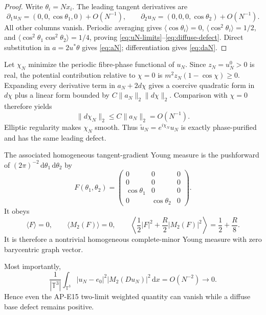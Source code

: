 \documentclass[10pt]{article}
\newcommand{\dd}{\,\mathrm d}
\newcommand{\TT}{\mathbb T}
\begin{document}
\begin{proof}
Write $\theta_i=Nx_i$.  The leading tangent derivatives are
\[
 \partial_1u_N=(0,0,\cos\theta_1,0)+O(N^{-1}),\qquad
 \partial_2u_N=(0,0,0,\cos\theta_2)+O(N^{-1}).
\]
All other columns vanish.  Periodic averaging gives
$\langle\cos\theta_i\rangle=0$,
$\langle\cos^2\theta_i\rangle=1/2$, and
$\langle\cos^2\theta_1\cos^2\theta_2\rangle=1/4$, proving
\eqref{eq:uN-limits}--\eqref{eq:diffuse-defect}.  Direct substitution in
$a=2u^*\theta$ gives \eqref{eq:aN}; differentiation gives \eqref{eq:daN}.
\end{proof}

Let $\chi_N$ minimize the periodic fibre-phase functional of $u_N$.  Since
$z_N=u_N^0>0$ is real, the potential contribution relative to $\chi=0$ is
$m^2z_N(1-\cos\chi)\geq0$.  Expanding every derivative term in
$a_N+2d\chi$ gives a coercive quadratic form in $d\chi$ plus a linear form
bounded by $C\|a_N\|_2\|d\chi\|_2$.  Comparison with $\chi=0$ therefore yields
\begin{equation}
 \|d\chi_N\|_2\leq C\|a_N\|_2=O(N^{-1}).
 \label{eq:phase-correction}
\end{equation}
Elliptic regularity makes $\chi_N$ smooth.  Thus
$\widetilde u_N=e^{i\chi_N}u_N$ is exactly phase-purified and has the same
leading defect.

The associated homogeneous tangent-gradient Young measure is the pushforward
of $(2\pi)^{-2}\dd\theta_1\dd\theta_2$ by
\begin{equation}
 F(\theta_1,\theta_2)=
 \begin{pmatrix}
 0&0&0\\
 0&0&0\\
 \cos\theta_1&0&0\\
 0&\cos\theta_2&0
 \end{pmatrix}.
 \label{eq:young-generator}
\end{equation}
It obeys
\begin{equation}
 \langle F\rangle=0,\qquad
 \langle M_2(F)\rangle=0,\qquad
 \left\langle\frac12|F|^2+\frac R2|M_2(F)|^2\right\rangle
 =\frac12+\frac R8.
 \label{eq:young-gap}
\end{equation}
It is therefore a nontrivial homogeneous complete-minor Young measure with
zero barycentric graph vector.

Most importantly,
\begin{equation}
 \frac1{|\TT^3|}\int_{\TT^3}
 |u_N-e_0|^2|M_2(Du_N)|^2\dd x
 =O(N^{-2})\longrightarrow0.
 \label{eq:weighted-zero}
\end{equation}
Hence even the AP-E15 two-limit weighted quantity can vanish while a diffuse
base defect remains positive.
\end{document}
